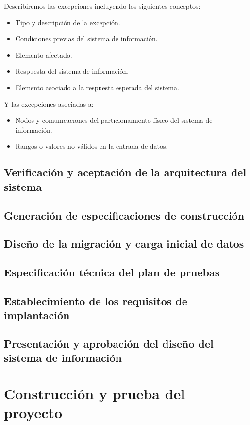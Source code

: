 \documentclass[11pt,a4paper,spanish,twoside]{report}
\begin{document}
\begin{itemize}
Describiremos las excepciones incluyendo los siguientes conceptos:
\begin{itemize}
\item Tipo y descripción de la excepción.
\item Condiciones previas del sistema de información.
\item Elemento afectado.
\item Respuesta del sistema de información.
\item Elemento asociado a la respuesta esperada del sistema.
\end{itemize}

Y las excepciones asociadas a:
\begin{itemize}
\item Nodos y comunicaciones del particionamiento físico del sistema de
  información. 
\item Rangos o valores no válidos en la entrada de datos.
\end{itemize}

\subsection{Verificación y aceptación de la arquitectura del sistema}
\subsection{Generación de especificaciones de construcción}
\subsection{Diseño de la migración y carga inicial de datos}
\subsection{Especificación técnica del plan de pruebas}
\subsection{Establecimiento de los requisitos de implantación}
\subsection{Presentación y aprobación del diseño del sistema de información}
\section{Construcción y prueba del proyecto}

\end{itemize}
\end{document}
